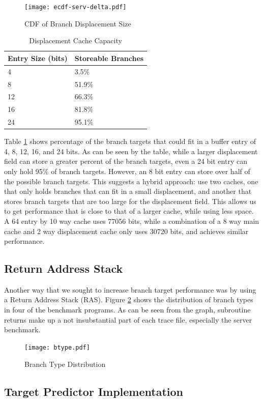 \documentclass[twocolumn]{article}
\newcommand{\centerimage}[3]{
\begin{figure}[ht!]  
\begin{center} #1
\caption{#2}
\label{#3}
\end{center}
\end{figure}}
\begin{document}
\centerimage{\texttt{[image: ecdf-serv-delta.pdf]}}{CDF
  of Branch Displacement Size}{ddelta}


\begin{table}\begin{center}\begin{tabular}{ll}

Entry Size (bits) & Storeable Branches \\
\hline
4 & 3.5\% \\
8 & 51.9\% \\
12 & 66.3\% \\
16 & 81.8\% \\
24 & 95.1\% 
\end{tabular}\end{center}
\caption{Displacement Cache Capacity}
\label{dtable}
\end{table}

Table \ref{dtable} shows percentage of the branch targets that could
fit in a buffer entry of 4, 8, 12, 16, and 24 bits. As can be seen by
the table, while a larger displacement field can store a greater
percent of the branch targets, even a 24 bit entry can only hold 95\%
of branch targets. However, an 8 bit entry can store over half of the
possible branch targets. This suggests a hybrid approach: use two
caches, one that only holds branches that can fit in a small
displacement, and another that stores branch targets that are too
large for the displacement field. This allows us to get performance
that is close to that of a larger cache, while using less space. A 64
entry by 10 way cache uses 77056 bits, while a combination of a 8 way
main cache and 2 way displacement cache only uses 30720 bits, and
achieves similar performance.

\subsection{Return Address Stack}
Another way that we sought to increase branch target performance was
by using a Return Address Stack (RAS). Figure \ref{btype} shows the
distribution of branch types in four of the benchmark programs. As can
be seen from the graph, subroutine returns make up a not insubstantial
part of each trace file, especially the server benchmark. 

\centerimage{\texttt{[image: btype.pdf]}}{Branch Type Distribution}{btype}


\subsection{Target Predictor Implementation}
\end{document}
